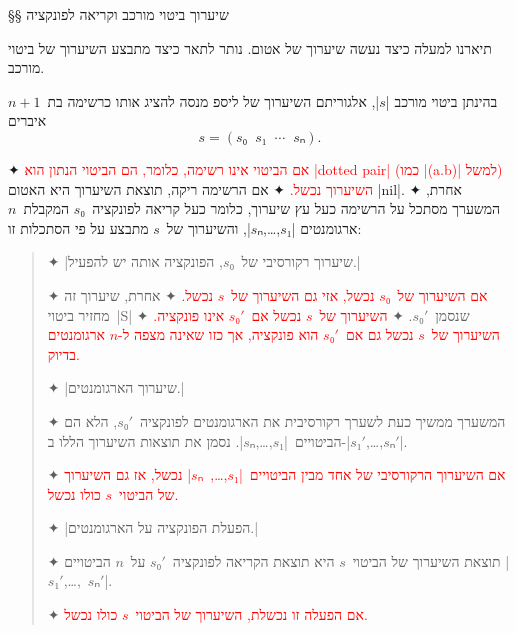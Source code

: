 §§ שיערוך ביטוי מורכב וקריאה לפונקציה

תיארנו למעלה כיצד נעשה שיערוך של אטום. נותר לתאר כיצד מתבצע השיערוך של ביטוי
מורכב.

\minipage\textwidth
\newcommand\exception[1]{{\textcolor{red}{#1}}}
\begin{mdframed}[backgroundcolor=Lavender!20]
  \footnotesize
  בהינתן ביטוי מורכב \E|$s$|, אלגוריתם השיערוך של ליספ מנסה
  להציג אותו כרשימה בת~$n+1$ איברים \[
    s=(s₀\;\;s₁\;\;⋯\;\;sₙ).
\] \begin{enumerate}
    ✦ \exception{
      אם הביטוי אינו רשימה, כלומר, הם הביטוי הנתון הוא \E|dotted pair| (כמו
      \E|(a.b)| למשל) השיערוך נכשל.}
    ✦ אם הרשימה ריקה, תוצאת השיערוך היא האטום \T|nil|.
    ✦ אחרת, המשערך מסתכל על הרשימה כעל עץ שיערוך, כלומר כעל קריאה
    לפונקציה~$s₀$ המקבלת~$n$ ארגומנטים \E|$s₁$,…,$sₙ$|, והשיערוך של~$s$ מתבצע
    על פי הסתכלות זו:
    \begin{quote}
      \begin{enumerate}
        ✦ \ע|שיערוך רקורסיבי של~$s₀$, הפונקציה אותה יש להפעיל.|
        \begin{itemize}
          ✦ \exception{אם השיערוך של~$s₀$ נכשל, אזי גם השיערוך של~$s$ נכשל.}
          ✦ אחרת, שיערוך זה מחזיר ביטוי~\E|S| שנסמן~$s₀'$.
          ✦ \exception{השיערוך של~$s$ נכשל אם~$s₀'$ אינו פונקציה.}
          ✦ \exception{השיערוך של~$s$ נכשל גם אם~$s₀'$ הוא פונקציה, אך כזו שאינה מצפה ל-$n$ ארגומנטים בדיוק.}
        \end{itemize}
        ✦ \ע|שיערוך הארגומנטים.|
        \begin{itemize}
          ✦ המשערך ממשיך כעת לשערך רקורסיבית את הארגומנטים לפונקציה~$s₀'$,
          הלא הם הביטויים~\E|$s₁$,…,$sₙ$|. נסמן את תוצאות השיערוך הללו
          ב-\E|$s₁'$,…,$sₙ'$|.

          ✦ \exception{אם השיערוך הרקורסיבי של אחד מבין
            הביטויים~\E|$s₁$,…,~$sₙ$| נכשל, אז גם השיערוך של הביטוי~$s$ כולו
            נכשל.}
        \end{itemize}

        ✦ \ע|הפעלת הפונקציה על הארגומנטים.|

        \begin{itemize}
          ✦ תוצאת השיערוך של הביטוי~$s$ היא תוצאת הקריאה לפונקציה~$s₀'$
            על~$n$ הביטויים \E|$s₁'$,…,~$sₙ'$|.

          ✦ \exception{אם הפעלה זו נכשלת, השיערוך של הביטוי~$s$ כולו נכשל.}
        \end{itemize}
      \end{enumerate}
    \end{quote}
  \end{enumerate}
\end{mdframed}
\endminipage

